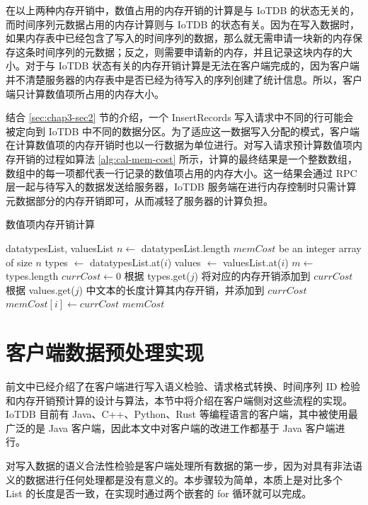 在以上两种内存开销中，数值占用的内存开销的计算是与 IoTDB 的状态无关的，而时间序列元数据占用的内存计算则与 IoTDB 的状态有关。因为在写入数据时，如果内存表中已经包含了写入的时间序列的数据，那么就无需申请一块新的内存保存这条时间序列的元数据；反之，则需要申请新的内存，并且记录这块内存的大小。对于与 IoTDB 状态有关的内存开销计算是无法在客户端完成的，因为客户端并不清楚服务器的内存表中是否已经为待写入的序列创建了统计信息。所以，客户端只计算数值项所占用的内存大小。

结合 \ref{sec:chap3-sec2} 节的介绍，一个 InsertRecords 写入请求中不同的行可能会被定向到 IoTDB 中不同的数据分区。为了适应这一数据写入分配的模式，客户端在计算数值项的内存开销时也以一行数据为单位进行。对写入请求预计算数值项内存开销的过程如算法 \ref{alg:cal-mem-cost} 所示，计算的最终结果是一个整数数组，数组中的每一项都代表一行记录的数值项占用的内存大小。这一结果会通过 RPC 层一起与待写入的数据发送给服务器，IoTDB 服务端在进行内存控制时只需计算元数据部分的内存开销即可，从而减轻了服务器的计算负担。

\begin{algorithm}
  \caption{数值项内存开销计算}
  \label{alg:cal-mem-cost}
  \small
  \begin{algorithmic}
    \REQUIRE datatypesList, valuesList
    \STATE $n \leftarrow$ datatypesList.length
    \STATE $memCost$ be an integer array of size $n$
      \STATE types $\leftarrow$ datatypesList.at($i$)
      \STATE values $\leftarrow$ valuesList.at($i$)
      \STATE $m \leftarrow$ types.length
      \STATE $currCost \leftarrow 0$
        \STATE 根据 types.get($j$) 将对应的内存开销添加到 $currCost$
          \STATE 根据 values.get($j$) 中文本的长度计算其内存开销，并添加到 $currCost$
        \ENDIF 
      \ENDFOR
      \STATE $memCost[i] \leftarrow currCost$
    \ENDFOR
    \RETURN $memCost$
  \end{algorithmic}
\end{algorithm}

\section{客户端数据预处理实现}
前文中已经介绍了在客户端进行写入语义检验、请求格式转换、时间序列 ID 检验和内存开销预计算的设计与算法，本节中将介绍在客户端侧对这些流程的实现。IoTDB 目前有 Java、C++、Python、Rust 等编程语言的客户端，其中被使用最广泛的是 Java 客户端，因此本文中对客户端的改进工作都基于 Java 客户端进行。

对写入数据的语义合法性检验是客户端处理所有数据的第一步，因为对具有非法语义的数据进行任何处理都是没有意义的。本步骤较为简单，本质上是对比多个 List 的长度是否一致，在实现时通过两个嵌套的 for 循环就可以完成。

